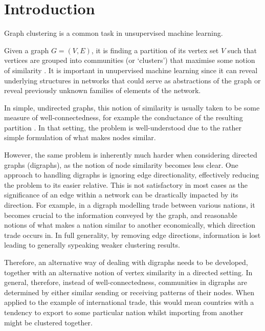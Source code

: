 
\chapter{Introduction}

Graph clustering is a common task in unsupervised machine learning.

Given a graph $G = (V, E)$, it is finding a partition of its vertex set $V$ such that vertices are 
grouped into communities (or `clusters') that maximise some notion of 
similarity \cite{jain1988algorithms}. It is important in unupervised machine learning since it can 
reveal underlying structures in networks that could serve as abstractions of the graph or reveal 
previously unknown families of elements of the network.

In simple, undirected graphs, this notion of similarity is usually taken to be some 
measure of well-connectedness, for example the conductance of the resulting partition \cite{conductance}. In that 
setting, the problem is well-understood due to the rather simple formulation of what makes nodes 
similar. 

However, the same problem is inherently much harder when considering directed graphs (digraphs), 
as the notion of node similarity becomes less clear. One approach to handling digraphs is ignoring 
edge directionality, effectively reducing the problem to its easier relative. This is not 
satisfactory in most cases as the significance of an edge within a network can be drastically 
impacted by its direction. For example, in a digraph modelling trade between various nations, it 
becomes crucial to the information conveyed by the graph, and reasonable notions of what makes a 
nation similar to another economically, which direction trade occurs in. In full generality, by 
removing edge directions, information is lost leading to generally sypeaking weaker clustering 
results. 

Therefore, an alternative way of dealing with digraphs needs to be developed, together with an 
alternative notion of vertex similarity in a directed setting. In general, therefore, instead of
well-connectedness, communities in digraphs are determined by either similar sending or receiving 
patterns of their nodes. When applied to the example of international trade, this would mean 
countries with a tendency to export to some particular nation whilst importing from another might 
be clustered together. \\\ 

